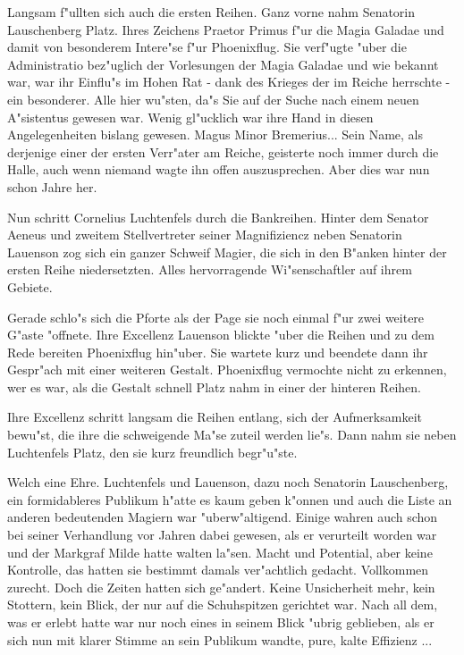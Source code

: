 \documentclass[a5paper,8pt]{book}
\begin{document}
Langsam f"ullten sich auch die ersten Reihen. Ganz vorne nahm Senatorin Lauschenberg Platz. Ihres Zeichens Praetor Primus f"ur die Magia Galadae und damit von besonderem Intere"se f"ur Phoenixflug. Sie verf"ugte "uber die Administratio bez"uglich der Vorlesungen der Magia Galadae und wie bekannt war, war ihr Einflu"s im Hohen Rat - dank des Krieges der im Reiche herrschte - ein besonderer. Alle hier wu"sten, da"s Sie auf der Suche nach einem neuen A"sistentus gewesen war. Wenig gl"ucklich war ihre Hand in diesen Angelegenheiten bislang gewesen. Magus Minor Bremerius... Sein Name, als derjenige einer der ersten Verr"ater am Reiche, geisterte noch immer durch die Halle, auch wenn niemand wagte ihn offen auszusprechen. Aber dies war nun schon Jahre her.

Nun schritt Cornelius Luchtenfels durch die Bankreihen. Hinter dem Senator Aeneus und zweitem Stellvertreter seiner Magnifiziencz neben Senatorin Lauenson zog sich ein ganzer Schweif Magier, die sich in den B"anken hinter der ersten Reihe niedersetzten. Alles hervorragende Wi"senschaftler auf ihrem Gebiete.

Gerade schlo"s sich die Pforte als der Page sie noch einmal f"ur zwei weitere G"aste "offnete. Ihre Excellenz Lauenson blickte "uber die Reihen und zu dem Rede bereiten Phoenixflug hin"uber. Sie wartete kurz und beendete dann ihr Gespr"ach mit einer weiteren Gestalt. Phoenixflug vermochte nicht zu erkennen, wer es war, als die Gestalt schnell Platz nahm in einer der hinteren Reihen.

Ihre Excellenz schritt langsam die Reihen entlang, sich der Aufmerksamkeit bewu"st, die ihre die schweigende Ma"se zuteil werden lie"s. Dann nahm sie neben Luchtenfels Platz, den sie kurz freundlich begr"u"ste.

Welch eine Ehre. Luchtenfels und Lauenson, dazu noch Senatorin Lauschenberg, ein formidableres Publikum h"atte es kaum geben k"onnen und auch die Liste an anderen bedeutenden Magiern war "uberw"altigend. Einige wahren auch schon bei seiner Verhandlung vor Jahren dabei gewesen, als er verurteilt worden war und der Markgraf Milde hatte walten la"sen. Macht und Potential, aber keine Kontrolle, das hatten sie bestimmt damals ver"achtlich gedacht. Vollkommen zurecht. Doch die Zeiten hatten sich ge"andert. Keine Unsicherheit mehr, kein Stottern, kein Blick, der nur auf die Schuhspitzen gerichtet war. Nach all dem, was er erlebt hatte war nur noch eines in seinem Blick "ubrig geblieben, als er sich nun mit klarer Stimme an sein Publikum wandte, pure, kalte Effizienz ...
\end{document}
